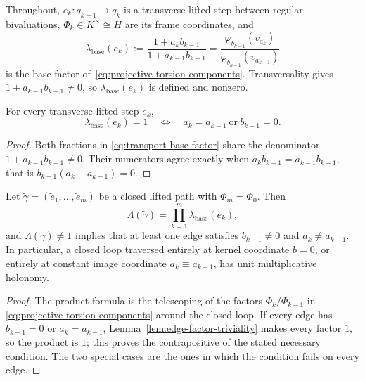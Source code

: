 Throughout, $e_k:q_{k-1}\to q_k$ is a transverse lifted step between regular
bivaluations, $\Phi_k\in K^{\times}\cong H$ are its frame coordinates, and
\begin{equation}\label{eq:transport-base-factor}
  \lambda_{\mathrm{base}}(e_k)
  :=\frac{1+a_kb_{k-1}}{1+a_{k-1}b_{k-1}}
  =\frac{\varphi_{b_{k-1}}(v_{a_k})}{\varphi_{b_{k-1}}(v_{a_{k-1}})}
\end{equation}
is the base factor of~\eqref{eq:projective-torsion-components}.  Transversality
gives $1+a_{k-1}b_{k-1}\ne0$, so $\lambda_{\mathrm{base}}(e_k)$ is defined and
nonzero.

\begin{lemma}
\label{lem:edge-factor-triviality}
For every transverse lifted step $e_k$,
\[
  \lambda_{\mathrm{base}}(e_k)=1
  \quad\Longleftrightarrow\quad
  a_k=a_{k-1}\ \text{or}\ b_{k-1}=0 .
\]
\end{lemma}

\begin{proof}
Both fractions in \eqref{eq:transport-base-factor} share the denominator
$1+a_{k-1}b_{k-1}\ne0$.  Their numerators agree exactly when
$a_kb_{k-1}=a_{k-1}b_{k-1}$, that is $b_{k-1}(a_k-a_{k-1})=0$.
\end{proof}

\begin{corollary}
\label{cor:nontrivial-edge}
Let $\tilde\gamma=(\tilde e_1,\dots,\tilde e_m)$ be a closed lifted path with
$\Phi_m=\Phi_0$.  Then
\[
  \Lambda(\tilde\gamma)=\prod_{k=1}^{m}\lambda_{\mathrm{base}}(e_k),
\]
and $\Lambda(\tilde\gamma)\ne1$ implies that at least one edge satisfies
$b_{k-1}\ne0$ and $a_k\ne a_{k-1}$.  In particular, a closed loop traversed
entirely at kernel coordinate $b=0$, or entirely at constant image coordinate
$a_k\equiv a_{k-1}$, has unit multiplicative holonomy.
\end{corollary}

\begin{proof}
The product formula is the telescoping of the factors $\Phi_k/\Phi_{k-1}$ in
\eqref{eq:projective-torsion-components} around the closed loop.  If every edge
has $b_{k-1}=0$ or $a_k=a_{k-1}$, Lemma~\ref{lem:edge-factor-triviality} makes
every factor $1$, so the product is $1$; this proves the contrapositive of the
stated necessary condition.  The two special cases are the ones in which the
condition fails on every edge.
\end{proof}

